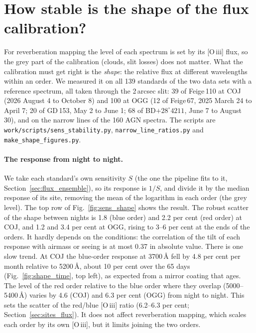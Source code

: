 \section{How stable is the shape of the flux calibration?}
\label{sec:shape_stability}
For reverberation mapping the level of each spectrum is set by its [O\,{\sc iii}] flux, so the grey part of the
calibration (clouds, slit losses) does not matter. What the calibration must get right is the \textit{shape}: the
relative flux at different wavelengths within an order. We measured it on all 139 standards of the two data sets
with a reference spectrum, all taken through the 2\,arcsec slit: 39 of Feige\,110 at COJ (2026 August 4 to October 8)
and 100 at OGG (12 of Feige\,67, 2025 March 24 to April 7; 20 of GD\,153, May 2 to June 1; 68 of
BD$+28^\circ4211$, June 7 to August 30), and on the narrow lines of the 160 AGN spectra. The scripts are
\texttt{work/scripts/sens\_stability.py}, \texttt{narrow\_line\_ratios.py} and \texttt{make\_shape\_figures.py}.

\paragraph{The response from night to night.} We take each standard's own sensitivity $S$ (the one the pipeline
fits to it, Section~\ref{sec:flux_ensemble}), so its response is $1/S$, and divide it by the median response of its
site, removing the mean of the logarithm in each order (the grey level). The top row of Fig.~\ref{fig:sens_shape}
shows the result. The robust scatter of the shape between nights is 1.8 (blue order) and 2.2 per cent (red order) at
COJ, and 1.2 and 3.4 per cent at OGG, rising to 3--6 per cent at the ends of the orders. It hardly depends on the
conditions: the correlation of the tilt of each response with airmass or seeing is at most 0.37 in absolute value.
There is one slow trend. At COJ the blue-order response at 3700\,\AA{} fell by 4.8 per cent per month relative to
5200\,\AA{}, about 10 per cent over the 65 days (Fig.~\ref{fig:shape_time}, top left), as expected from a mirror
coating that ages. The level of the red order relative to the blue order where they overlap (5000--5400\,\AA) varies
by 4.6 (COJ) and 6.3 per cent (OGG) from night to night. This sets the scatter of the red/blue [O\,{\sc iii}]
ratio (6.2--6.3 per cent; Section~\ref{sec:sites_flux}). It does not affect reverberation mapping, which scales each
order by its own [O\,{\sc iii}], but it limits joining the two orders.


